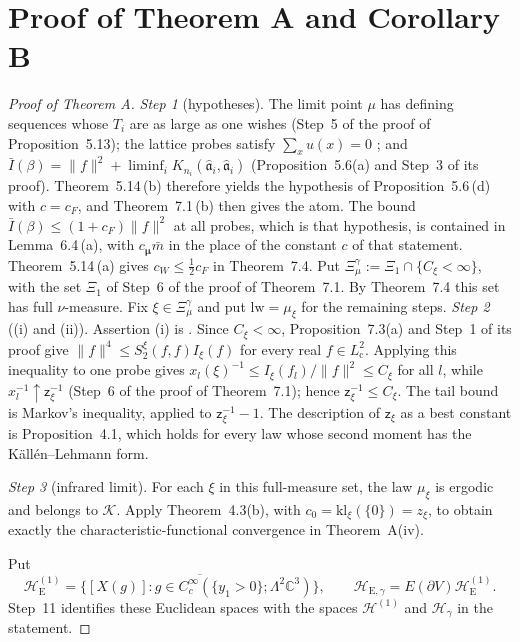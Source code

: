 \documentclass[11pt,letterpaper,reqno]{amsart}
\theoremstyle{definition}
\begin{document}
\section{Proof of Theorem A and Corollary B}
\begin{proof}[Proof of Theorem A]
\emph{Step 1} (hypotheses).
The limit point $\mu$ has defining sequences whose $T_i$ are as large as one wishes (Step~5 of the proof of Proposition~5.13);
the lattice probes satisfy $\sum_xu(x)=0$ \cite[Proposition~47.1\,(b1)]{QEDIII};
and $\bar I(\beta)=\allowbreak \|f\|^2+\liminf_iK_{n_i}(\hat{\mathfrak a}_i,\allowbreak \hat{\mathfrak a}_i)$ (Proposition~5.6(a) and Step~3 of its proof).
Theorem~5.14\,(b) therefore yields the hypothesis of Proposition~5.6\,(d) with $c=c_F$, and Theorem~7.1\,(b) then gives the atom.
The bound $\bar I(\beta)\le(1+c_F)\|f\|^2$ at all probes, which is that hypothesis, is contained in Lemma~6.4\,(a), with $c_{\boldsymbol\mu}\bar m$ in the place of the constant $c$ of that statement.
Theorem~5.14\,(a) gives $c_W\le\frac12c_F$ in Theorem~7.4.
Put $\Xi^\gamma_\mu:=\Xi_1\cap\{C_\xi<\infty\}$, with the set $\Xi_1$ of Step~6 of the proof of Theorem~7.1. By Theorem~7.4 this set has full $\nu$-measure.
Fix $\xi\in\Xi^\gamma_\mu$ and put $\mathrm{lw}=\mu_\xi$ for the remaining steps.
\emph{Step 2} ((i) and (ii)).
Assertion (i) is \cite[Theorem~1.4, Part~I\,(e), (f), Part~II]{QEDII}.
Since $C_\xi<\infty$, Proposition~7.3(a) and Step~1 of its proof give
$\|f\|^4\le S_2^\xi(f,f)I_\xi(f)$ for every real $f\in L^2_{\mathrm c}$.
Applying this inequality to one probe gives $x_l(\xi)^{-1}\le I_\xi(f_l)/\|f\|^2\le C_\xi$ for all $l$, while $x_l^{-1}\uparrow\mathsf z_\xi^{-1}$ (Step~6 of the proof of Theorem~7.1);
hence $\mathsf z_\xi^{-1}\le C_\xi$.
The tail bound is Markov's inequality, applied to $\mathsf z_\xi^{-1}-1$.
The description of $\mathsf z_\xi$ as a best constant is Proposition~4.1, which holds for every law whose second moment has the K\"all\'en--Lehmann form.

\emph{Step 3} (infrared limit).
For each $\xi$ in this full-measure set, the law $\mu_\xi$ is ergodic
and belongs to $\mathcal K$. Apply Theorem~4.3(b), with
$c_0=\mathrm{kl}_\xi(\{0\})=z_\xi$, to obtain exactly the
characteristic-functional convergence in Theorem~A(iv).

Put
\[
\mathcal H_{\mathrm E}^{(1)}=
\overline{\{[X(g)]:g\in C_c^\infty(\{y_1>0\};\Lambda^2\mathbb C^3)\}},
\qquad
\mathcal H_{\mathrm E,\gamma}=E(\partial V)\mathcal H_{\mathrm E}^{(1)}.
\]
Step~11 identifies these Euclidean spaces with the spaces
$\mathcal H^{(1)}$ and $\mathcal H_\gamma$ in the statement.


\end{proof}
\end{document}
